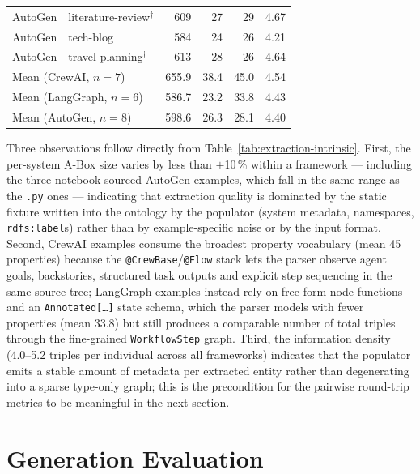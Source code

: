 \begin{table}[ht]
{\begin{tabular}{l l r r r r}
    AutoGen   & literature-review$^\dagger$ & 609 & 27 & 29 & 4.67\\
    AutoGen   & tech-blog              & 584 & 24 & 26 & 4.21\\
    AutoGen   & travel-planning$^\dagger$ & 613 & 28 & 26 & 4.64\\
    \midrule
    \multicolumn{2}{l}{Mean (CrewAI, $n{=}7$)}    & 655.9 & 38.4 & 45.0 & 4.54\\
    \multicolumn{2}{l}{Mean (LangGraph, $n{=}6$)} & 586.7 & 23.2 & 33.8 & 4.43\\
    \multicolumn{2}{l}{Mean (AutoGen, $n{=}8$)}   & 598.6 & 26.3 & 28.1 & 4.40\\
    \bottomrule
  \end{tabular}
  }
\end{table}

Three observations follow directly from
Table~\ref{tab:extraction-intrinsic}. First, the per-system A-Box size
varies by less than $\pm$10\,\% within a framework — including the
three notebook-sourced AutoGen examples, which fall in the same
range as the \texttt{.py} ones — indicating that extraction quality
is dominated by the static fixture written into the ontology by the
populator (system metadata, namespaces, \texttt{rdfs:label}s) rather
than by example-specific noise or by the input format. Second, CrewAI examples consume
the broadest property vocabulary (mean 45 properties) because the
\texttt{@CrewBase}/\texttt{@Flow} stack lets the parser observe agent
goals, backstories, structured task outputs and explicit step
sequencing in the same source tree; LangGraph examples instead rely on
free-form node functions and an \texttt{Annotated[\dots]} state
schema, which the parser models with fewer properties (mean 33.8) but
still produces a comparable number of total triples through the
fine-grained \texttt{WorkflowStep} graph. Third, the information
density (4.0–5.2 triples per individual across all frameworks)
indicates that the populator emits a stable amount of metadata per
extracted entity rather than degenerating into a sparse type-only
graph; this is the precondition for the pairwise round-trip metrics
to be meaningful in the next section.

\section{Generation Evaluation}\label{sec:generation-eval}

